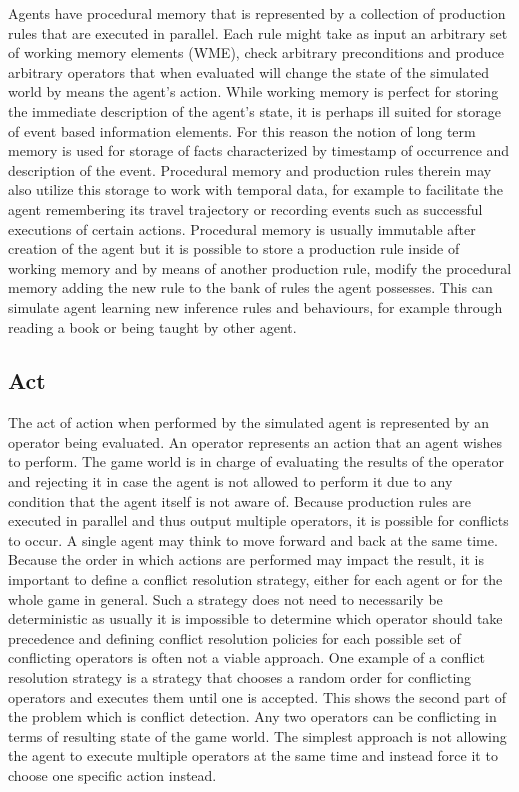 Agents have procedural memory that is represented by a collection of production rules that are executed in parallel.
Each rule might take as input an arbitrary set of working memory elements (WME), check arbitrary preconditions and produce arbitrary operators that when evaluated will change the state of the simulated world by means the agent's action.
While working memory is perfect for storing the immediate description of the agent's state, it is perhaps ill suited for storage of event based information elements.
For this reason the notion of long term memory is used for storage of facts characterized by timestamp of occurrence and description of the event.
Procedural memory and production rules therein may also utilize this storage to work with temporal data, for example to facilitate the agent remembering its travel trajectory or recording events such as successful executions of certain actions.
Procedural memory is usually immutable after creation of the agent but it is possible to store a production rule inside of working memory and by means of another production rule, modify the procedural memory adding the new rule to the bank of rules the agent possesses.
This can simulate agent learning new inference rules and behaviours, for example through reading a book or being taught by other agent.

\subsection{Act}

The act of action when performed by the simulated agent is represented by an operator being evaluated.
An operator represents an action that an agent wishes to perform.
The game world is in charge of evaluating the results of the operator and rejecting it in case the agent is not allowed to perform it due to any condition that the agent itself is not aware of.
Because production rules are executed in parallel and thus output multiple operators, it is possible for conflicts to occur.
A single agent may think to move forward and back at the same time.
Because the order in which actions are performed may impact the result, it is important to define a conflict resolution strategy, either for each agent or for the whole game in general.
Such a strategy does not need to necessarily be deterministic as usually it is impossible to determine which operator should take precedence and defining conflict resolution policies for each possible set of conflicting operators is often not a viable approach.
One example of a conflict resolution strategy is a strategy that chooses a random order for conflicting operators and executes them until one is accepted.
This shows the second part of the problem which is conflict detection.
Any two operators can be conflicting in terms of resulting state of the game world.
The simplest approach is not allowing the agent to execute multiple operators at the same time and instead force it to choose one specific action instead.

